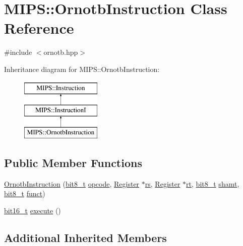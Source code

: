 \hypertarget{classMIPS_1_1OrnotbInstruction}{}\section{M\+I\+PS\+:\+:Ornotb\+Instruction Class Reference}
\label{classMIPS_1_1OrnotbInstruction}


{\ttfamily \#include $<$ornotb.\+hpp$>$}

Inheritance diagram for M\+I\+PS\+:\+:Ornotb\+Instruction\+:\begin{figure}[H]
\begin{center}
\leavevmode
\includegraphics[height=3.000000cm]{classMIPS_1_1OrnotbInstruction}
\end{center}
\end{figure}
\subsection*{Public Member Functions}
\begin{DoxyCompactItemize}
\item 
\hyperlink{classMIPS_1_1OrnotbInstruction_aea52181c168c690a024590196516c89e}{Ornotb\+Instruction} (\hyperlink{core_8hpp_a6074bae122ae7b527864eec42c728c3c}{bit8\+\_\+t} \hyperlink{classMIPS_1_1Instruction_a45cc6808b5dde8a5d41067d148b55476}{opcode}, \hyperlink{classMIPS_1_1Register}{Register} $\ast$\hyperlink{classMIPS_1_1InstructionI_a2be191d5b3dce505e2e626ec02eb4d62}{rs}, \hyperlink{classMIPS_1_1Register}{Register} $\ast$\hyperlink{classMIPS_1_1InstructionI_add1db07a5c954f35271de8c8a5737487}{rt}, \hyperlink{core_8hpp_a6074bae122ae7b527864eec42c728c3c}{bit8\+\_\+t} \hyperlink{classMIPS_1_1InstructionI_aa9b6da37c374c2ec8d96448d341e5e7d}{shamt}, \hyperlink{core_8hpp_a6074bae122ae7b527864eec42c728c3c}{bit8\+\_\+t} \hyperlink{classMIPS_1_1InstructionI_a5c6efcbbd233a7447c1fe24ea0a1e558}{funct})
\item 
\hyperlink{core_8hpp_adc265a970bc35995b5879784bbb3f1b7}{bit16\+\_\+t} \hyperlink{classMIPS_1_1OrnotbInstruction_a47aac4ac3ef0ee8c6a694189f26bd80e}{execute} ()
\end{DoxyCompactItemize}
\subsection*{Additional Inherited Members}


